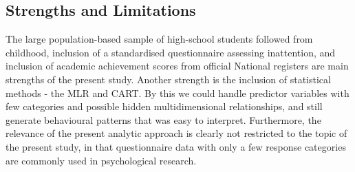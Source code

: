 \documentclass[10pt,letterpaper]{article}
\begin{document}
%
% 
%

 \subsection*{Strengths and Limitations}
The large population-based sample of high-school students followed from childhood, inclusion of a standardised questionnaire assessing inattention, and inclusion of academic achievement scores from official National registers are main strengths of the present study. Another strength is the inclusion of statistical methods - the MLR and CART. By this we could handle predictor variables with few categories and possible hidden multidimensional relationships, and still generate behavioural patterns that was easy to interpret. Furthermore,  the  relevance of the present analytic approach is clearly not restricted to the topic of the present study, in that questionnaire data with only a few response categories are commonly used in psychological research. \\
\end{document}
